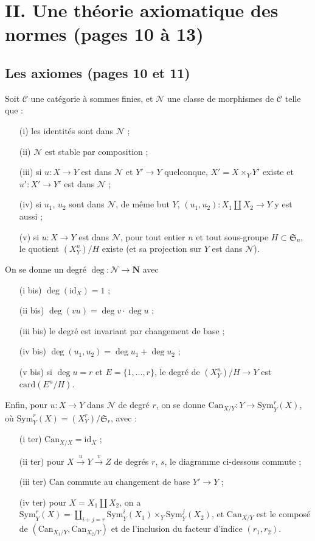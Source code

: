 \documentclass[11pt,a4paper]{article}
\begin{document}
\section*{II. Une théorie axiomatique des normes (pages 10 à 13)}

\subsection*{Les axiomes (pages 10 et 11)}

Soit $\mathcal{C}$ une catégorie à sommes finies, et $\mathcal{N}$ une
classe de morphismes de $\mathcal{C}$ telle que :
\begin{enumerate}
\item[(i)] les identités sont dans $\mathcal{N}$ ;
\item[(ii)] $\mathcal{N}$ est stable par composition ;
\item[(iii)] si $u : X \to Y$ est dans $\mathcal{N}$ et $Y' \to Y$
quelconque, $X' = X \times_Y Y'$ existe et $u' : X' \to Y'$ est dans
$\mathcal{N}$ ;
\item[(iv)] si $u_1$, $u_2$ sont dans $\mathcal{N}$, de même but $Y$,
$(u_1, u_2) : X_1 \amalg X_2 \to Y$ y est aussi ;
\item[(v)] si $u : X \to Y$ est dans $\mathcal{N}$, pour tout entier $n$ et
tout sous-groupe $H \subset \mathfrak{S}_n$, le quotient
$(X^{n}_{Y})/H$ existe (et sa projection sur $Y$ est dans
$\mathcal{N}$).
\end{enumerate}
On se donne un degré $\deg : \mathcal{N} \to \mathbf{N}$ avec
\begin{enumerate}
\item[(i bis)] $\deg(\mathrm{id}_X) = 1$ ;
\item[(ii bis)] $\deg(vu) = \deg v \cdot \deg u$ ;
\item[(iii bis)] le degré est invariant par changement de base ;
\item[(iv bis)] $\deg(u_1, u_2) = \deg u_1 + \deg u_2$ ;
\item[(v bis)] si $\deg u = r$ et $E = \{1, \ldots, r\}$, le degré de
$(X^{n}_{Y})/H \to Y$ est $\mathrm{card}(E^{n}/H)$.
\end{enumerate}
Enfin, pour $u : X \to Y$ dans $\mathcal{N}$ de degré $r$, on se donne
$\mathrm{Can}_{X/Y} : Y \to \mathrm{Sym}^{r}_{Y}(X)$, où
$\mathrm{Sym}^{r}_{Y}(X) = (X^{r}_{Y})/\mathfrak{S}_r$, avec :
\begin{enumerate}
\item[(i ter)] $\mathrm{Can}_{X/X} = \mathrm{id}_X$ ;
\item[(ii ter)] pour $X \xrightarrow{u} Y \xrightarrow{v} Z$ de degrés $r$,
$s$, le diagramme ci-dessous commute ;
\item[(iii ter)] $\mathrm{Can}$ commute au changement de base $Y' \to Y$ ;
\item[(iv ter)] pour $X = X_1 \amalg X_2$, on a
$\mathrm{Sym}^{r}_{Y}(X) = \coprod_{i+j=r} \mathrm{Sym}^{i}_{Y}(X_1)
\times_Y \mathrm{Sym}^{j}_{Y}(X_2)$, et $\mathrm{Can}_{X/Y}$ est le composé
de $(\mathrm{Can}_{X_1/Y}, \mathrm{Can}_{X_2/Y})$ et de l'inclusion du
facteur d'indice $(r_1, r_2)$.
\end{enumerate}
\end{document}
